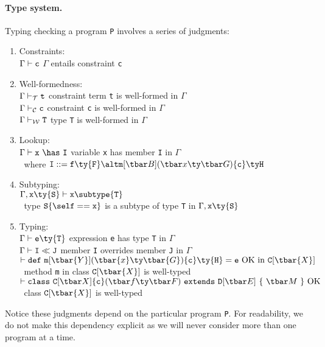 \paragraph{Type system.} Typing checking a program {\tt P} involves a series of judgments:
\begin{enumerate}
	\item Constraints:\\
	  $\Gamma\vdash {\tt c}$ \hfill $\Gamma$ entails constraint {\tt c}
	\item Well-formedness:\\
	  $\tj{\Gamma}{\tt t}$ \hfill constraint term {\tt t} is well-formed in $\Gamma$\\
	  $\cj{\Gamma}{\tt c}$ \hfill constraint {\tt c} is well-formed in $\Gamma$\\
	  $\wj{\Gamma}{\tt T}$ \hfill  type {\tt T} is well-formed in $\Gamma$
	\item Lookup:\\
	  $\Gamma\vdash {\tt x}~\has~{\tt I}$ \hfill variable {\tt x} has member {\tt I} in $\Gamma$\\
	  $~$ \hfill where ${\tt I}::= {\tt f}\ty{\tt F} \alt \msign{B}{x}{G}{c}{H}$
	\item Subtyping:\\
	  $\Gamma,{\tt x}\ty{\tt S}\vdash{\tt x}\subtype{\tt T}$ \\ $~$ \hfill type ${\tt S}\{\self=={\tt x}\}$ is a 	subtype of type {\tt T} in $\Gamma,{\tt x}\ty{\tt S}$
	\item Typing:\\
	  $\Gamma\vdash {\tt e}\ty{\tt T}$ \hfill expression {\tt e} has type {\tt T} in $\Gamma$\\
	  $\Gamma\vdash {\tt I}\ll {\tt J}$ \hfill member {\tt I} overrides member {\tt J} in $\Gamma$\\
	  $\vdash {\tt def}~{\tt m}[\tbar{Y}](\tbar{x}\ty \tbar{G})\{{\tt c}\}\ty {\tt H}={\tt e}~{\rm OK~in}~{\tt C}[\tbar{X}]$ \\ $~$ \hfill method {\tt m} in class ${\tt C}[\tbar{X}]$ is well-typed\\
	  $\vdash \cdecl~{\rm OK}$ \\ $~$ \hfill class ${\tt C}[\tbar{X}]$ is well-typed

\end{enumerate}

Notice these judgments depend on the particular program {\tt P}. For readability, we do not make this dependency explicit as we will never consider more than one program at a time.

